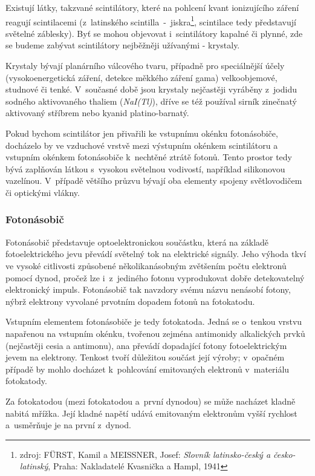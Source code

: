 Existují látky, takzvané scintilátory, které na pohlcení kvant ionizujícího záření reagují
scintilacemi (z~latinského scintilla~-~jiskra\footnote{zdroj: FÜRST, Kamil a MEISSNER, Josef:
\textit{Slovník latinsko-český a česko-latinský}, Praha: Nakladatelé Kvasnička a Hampl, 1941}, scintilace
tedy představují světel\-né záblesky).
Byť se mohou objevovat i~scintilátory kapalné či plynné, zde se budeme zabývat scintilátory
nejběžněji užívanými - krystaly. 

Krystaly bývají planárního válcového tvaru, případně pro speciálnější účely (vy\-soko\-energetická záření,
detekce měkkého záření gama) velkoobjemové, studnové či tenké. V~současné době jsou krystaly
nejčastěji vyráběny z~jodidu sodného aktivovaného thaliem (\textit{NaI(Tl)}), dříve se též
používal sirník zinečnatý aktivovaný stříbrem nebo kyanid platino-barnatý. 

Pokud bychom scintilátor jen přivařili ke vstupnímu okénku fotonásobiče, dochá\-zelo by
ve vzduchové vrstvě mezi výstupním okén\-kem scintilátoru a vstupním okén\-kem fotonásobiče k~nechtěné
ztrátě fotonů. Tento prostor tedy bývá zaplňován látkou s~vysokou světelnou vodivostí, například
silikonovou vazelínou. V~případě většího průzvu bývají oba elementy spojeny světlovodičem či
optickými vlákny. 

\subsubsection{Fotonásobič}
\label{fotonasobic}

Fotonásobič představuje optoelektronickou součástku, která na základě fotoelektrického jevu
převádí světelný tok na elektrické signály. Jeho výhoda tkví ve vysoké citlivosti způsobené
několikanásobným zvětšením počtu elektronů pomocí dynod, pročež lze i~z~jediného fotonu
vyprodukovat dobře detekovatelný elektronický impuls. Fotonásobič tak navzdory svému názvu nenásobí
fotony, nýbrž elektrony vyvolané prvotním dopadem fotonů na fotokatodu. 

Vstupním elementem fotonásobiče je tedy fotokatoda. Jedná se o~tenkou vrstvu napařenou na
vstupním okénku, tvořenou zejména antimonidy alkalických prvků (nejčastěji cesia a antimonu),
ana převádí dopadající fotony fotoelektrickým jevem na elektrony.
Tenkost tvoří důležitou součást její výroby; v~opačném případě by mohlo docházet k~pohlcování
emitovaných elektronů v~materiálu fotokatody. 

Za fotokatodou (mezi fotokatodou a~první dynodou) se může nacházet kladně nabitá mřížka.
Její kladné napětí udává emitovaným elektronům vyšší rychlost a~usměrňuje je na první z~dynod. 

